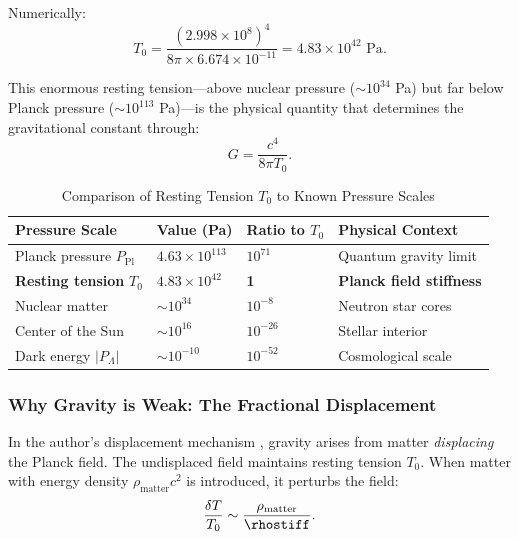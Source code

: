 Numerically:
\begin{equation}
\label{eq:T0_numerical}
T_0 = \frac{(2.998 \times 10^8)^4}{8\pi \times 6.674 \times 10^{-11}} = 4.83 \times 10^{42} \text{ Pa}.
\end{equation}

This enormous resting tension---above nuclear pressure ($\sim 10^{34}$ Pa) but far below Planck pressure ($\sim 10^{113}$ Pa)---is the physical quantity that determines the gravitational constant through:
\begin{equation}
\label{eq:G_from_T0}
\boxed{G = \frac{c^4}{8\pi T_0}.}
\end{equation}

\begin{table}[H]
\centering
\caption{Comparison of Resting Tension $T_0$ to Known Pressure Scales}
\label{tab:pressure_scales}
\begin{tabular}{@{}llll@{}}
\toprule
\textbf{Pressure Scale} & \textbf{Value (Pa)} & \textbf{Ratio to $T_0$} & \textbf{Physical Context} \\
\midrule
Planck pressure $P_{\mathrm{Pl}}$ & $4.63 \times 10^{113}$ & $10^{71}$ & Quantum gravity limit \\
\textbf{Resting tension} $T_0$ & $4.83 \times 10^{42}$ & \textbf{1} & \textbf{Planck field stiffness} \\
Nuclear matter & $\sim 10^{34}$ & $10^{-8}$ & Neutron star cores \\
Center of the Sun & $\sim 10^{16}$ & $10^{-26}$ & Stellar interior \\
Dark energy $|P_\Lambda|$ & $\sim 10^{-10}$ & $10^{-52}$ & Cosmological scale \\
\bottomrule
\end{tabular}
\end{table}

\subsubsection{Why Gravity is Weak: The Fractional Displacement}
\label{sec:weak_gravity}

In the author's displacement mechanism \cite{SkavbergMechG2025,SkavbergMechGR2025}, gravity arises from matter \emph{displacing} the Planck field. The undisplaced field maintains resting tension $T_0$. When matter with energy density $\rho_{\mathrm{matter}} c^2$ is introduced, it perturbs the field:
\begin{equation}
\label{eq:perturbation}
\frac{\delta T}{T_0} \sim \frac{\rho_{\mathrm{matter}}}{\rhostiff}.
\end{equation}

